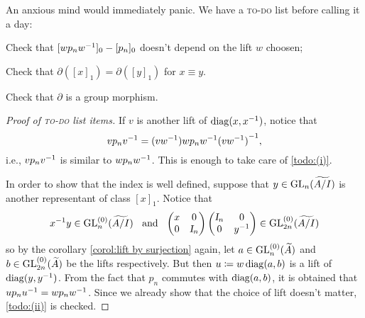 An anxious mind would immediately panic. We have a \textsc{to-do} list before calling it a day:
\begin{itroman}
    \item\label{todo:(i)} Check that $[wp_n {w}^{-1}]_0 - [p_n]_0$ doesn't depend on the lift $w$ choosen;
    \item\label{todo:(ii)} Check that $\partial([x]_1) = \partial([y]_1)$ for $x \equiv y$.
    \item\label{todo:(iii)} Check that $\partial$ is a group morphism.   
\end{itroman}
\begin{proof}[Proof of \textsc{to-do} list items]
    If $v$ is another lift of $\operatorname{diag}(x, {x}^{-1})$, notice that 
    $$
    vp_n {v}^{-1} = (v{w}^{-1})wp_n{w}^{-1}{(v{w}^{-1})}^{-1},
    $$
    i.e., $vp_n {v}^{-1}$ is similar to $wp_n {w}^{-1}$. This is enough to take care of \ref{todo:(i)}.

    In order to show that the index is well defined, suppose that $y \in \operatorname{GL}_n(\widetilde{A/I})$ is another representant of class $[x]_1$. Notice that 
    $$
    {x}^{-1}y \in \operatorname{GL}_n^{(0)}(\widetilde{A/I}) \hspace{0.25cm}\operatorname{and}\hspace{0.25cm} \begin{pmatrix} x & 0 \\ 0 & \textsl{I}_n\end{pmatrix}\begin{pmatrix} \textsl{I}_n & 0 \\ 0 & {y}^{-1}\end{pmatrix} \in \operatorname{GL}_{2n}^{(0)}(\widetilde{A/I})
    $$
    so by the corollary \ref{corol:lift by surjection} again, let $a \in \operatorname{GL}_n^{(0)}(\widetilde{A})$ and $b\in \operatorname{GL}_{2n}^{(0)}(\widetilde{A})$ be the lifts respectively. But then $u \coloneqq w \operatorname{diag}(a,b)$ is a lift of $\operatorname{diag}(y, {y}^{-1})$. From the fact that $p_n$ commutes with $\operatorname{diag}(a,b)$, it is obtained that $up_n {u}^{-1} = wp_n {w}^{-1}$. Since we already show that the choice of lift doesn't matter, \ref{todo:(ii)} is checked.
    

\end{proof}
